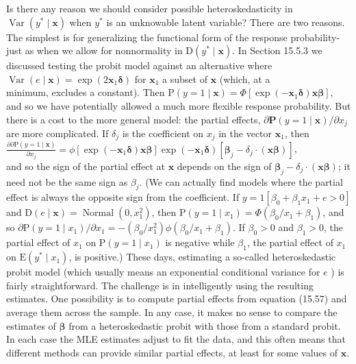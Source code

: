\documentclass[10pt]{article}
\begin{document}
Is there any reason we should consider possible heteroskedasticity in $\operatorname{Var}\left(y^{*} \mid \mathbf{x}\right)$ when $y^{*}$ is an unknowable latent variable? There are two reasons. The simplest is for generalizing the functional form of the response probability-just as when we allow for nonnormality in $\mathrm{D}\left(y^{*} \mid \mathbf{x}\right)$. In Section 15.5.3 we discussed testing the probit model against an alternative where $\operatorname{Var}(e \mid \mathbf{x})=\exp \left(2 \mathbf{x}_{1} \boldsymbol{\delta}\right)$ for $\mathbf{x}_{1}$ a subset of $\mathbf{x}$ (which, at a\\
minimum, excludes a constant). Then $\mathrm{P}(y=1 \mid \mathbf{x})=\Phi\left[\exp \left(-\mathbf{x}_{1} \boldsymbol{\delta}\right) \mathbf{x} \boldsymbol{\beta}\right]$, and so we have potentially allowed a much more flexible response probability. But there is a cost to the more general model: the partial effects, $\partial \mathbf{P}(y=1 \mid \mathbf{x}) / \partial x_{j}$ are more complicated. If $\delta_{j}$ is the coefficient on $x_{j}$ in the vector $\mathbf{x}_{1}$, then\\
$\frac{\partial \partial \mathrm{P}(y=1 \mid \mathbf{x})}{\partial x_{j}}=\phi\left[\exp \left(-\mathbf{x}_{1} \boldsymbol{\delta}\right) \mathbf{x} \boldsymbol{\beta}\right] \exp \left(-\mathbf{x}_{1} \boldsymbol{\delta}\right)\left[\boldsymbol{\beta}_{j}-\delta_{j} \cdot(\mathbf{x} \boldsymbol{\beta})\right]$,\\
and so the sign of the partial effect at $\mathbf{x}$ depends on the sign of $\boldsymbol{\beta}_{j}-\delta_{j} \cdot(\mathbf{x} \boldsymbol{\beta})$; it need not be the same sign as $\beta_{j}$. (We can actually find models where the partial effect is always the opposite sign from the coefficient. If $y=1\left[\beta_{0}+\beta_{1} x_{1}+e>0\right]$ and $\mathrm{D}(e \mid \mathbf{x})=\operatorname{Normal}\left(0, x_{1}^{2}\right)$, then $\mathrm{P}\left(y=1 \mid x_{1}\right)=\Phi\left(\beta_{0} / x_{1}+\beta_{1}\right)$, and so $\partial \mathrm{P}\left(y=1 \mid x_{1}\right) / \partial x_{1}=-\left(\beta_{0} / x_{1}^{2}\right) \phi\left(\beta_{0} / x_{1}+\beta_{1}\right)$. If $\beta_{0}>0$ and $\beta_{1}>0$, the partial effect of $x_{1}$ on $\mathrm{P}\left(y=1 \mid x_{1}\right)$ is negative while $\beta_{1}$, the partial effect of $x_{1}$ on $\mathrm{E}\left(y^{*} \mid x_{1}\right)$, is positive.) These days, estimating a so-called heteroskedastic probit model (which usually means an exponential conditional variance for $e$ ) is fairly straightforward. The challenge is in intelligently using the resulting estimates. One possibility is to compute partial effects from equation (15.57) and average them across the sample. In any case, it makes no sense to compare the estimates of $\boldsymbol{\beta}$ from a heteroskedastic probit with those from a standard probit. In each case the MLE estimates adjust to fit the data, and this often means that different methods can provide similar partial effects, at least for some values of $\mathbf{x}$.
\end{document}
